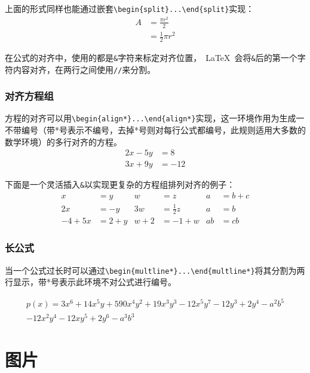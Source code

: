 上面的形式同样也能通过嵌套\verb|\begin{split}...\end{split}|实现：
\begin{equation}
\begin{split}
A & = \frac{\pi r^2}{2} \\
 & = \frac{1}{2} \pi r^2
\end{split}
\end{equation}

在公式的对齐中，使用的都是\verb|&|字符来标定对齐位置，~\LaTeX~会将\verb|&|后的第一个字符内容对齐，在两行之间使用\verb|//|来分割。

\subsubsection{对齐方程组}

方程的对齐可以用\verb|\begin{align*}...\end{align*}|实现，这一环境作用为生成一不带编号（带*号表示不编号，去掉*号则对每行公式都编号，此规则适用大多数的数学环境）的多行对齐的方程。
\begin{align*} 
2x - 5y &=  8 \\ 
3x + 9y &=  -12
\end{align*}

下面是一个灵活插入\verb|&|以实现更复杂的方程组排列对齐的例子：
\begin{align*}
x&=y           &  w &=z              &  a&=b+c\\
2x&=-y         &  3w&=\frac{1}{2}z   &  a&=b\\
-4 + 5x&=2+y   &  w+2&=-1+w          &  ab&=cb
\end{align*}

\subsubsection{长公式}

当一个公式过长时可以通过\verb|\begin{multline*}...\end{multline*}|将其分割为两行显示，带*号表示此环境不对公式进行编号。

\begin{multline*}
p(x) = 3x^6 + 14x^5y + 590x^4y^2 + 19x^3y^3- 12x^5y^7 - 12y^3 + 2y^4 - a^2b^5\\ 
- 12x^2y^4 - 12xy^5 + 2y^6 - a^3b^3
\end{multline*}

\section{图片}

